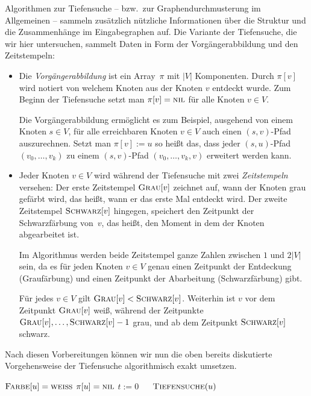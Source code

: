 \begin{bem}
Algorithmen zur Tiefensuche -- bzw.~zur Graphendurchmusterung im Allgemeinen -- sammeln zusätzlich nützliche Informationen über die Struktur und die Zusammenhänge im Eingabegraphen auf.
Die Variante der Tiefensuche, die wir hier untersuchen, sammelt Daten in Form der Vorgängerabbildung und den Zeitstempeln:
%
\begin{itemize}
 \item Die \emph{Vorgängerabbildung} ist ein Array~$\pi$ mit $|V|$ Komponenten.
 Durch $\pi[v]$ wird notiert von welchem Knoten aus der Knoten $v$ entdeckt wurde.
 Zum Beginn der Tiefensuche setzt man $\pi[v]=\mathop{\text{\textsc{nil}}}$ für alle Knoten $v \in V$.

 Die Vorgängerabbildung ermöglicht es zum Beispiel, ausgehend von einem Knoten $s \in V$, für alle erreichbaren Knoten $v \in V$ auch einen $(s,v)$-Pfad auszurechnen.
Setzt man $\pi[v]:=u$ so heißt das, dass jeder $(s,u)$-Pfad $(v_0,\ldots,v_k)$ zu einem $(s,v)$-Pfad $(v_0,\ldots,v_k,v)$ erweitert werden kann.
 \item Jeder Knoten $v \in V$ wird während der Tiefensuche mit zwei \emph{Zeitstempeln} versehen: Der erste Zeitstempel $\mathop{\text{\textsc{Grau}}}[v]$ zeichnet auf, wann der Knoten grau gefärbt wird, das heißt, wann er das erste Mal entdeckt wird.
Der zweite Zeitstempel $\mathop{\text{\textsc{Schwarz}}}[v]$ hingegen, speichert den Zeitpunkt der Schwarzfärbung von~$v$, das heißt, den Moment in dem der Knoten abgearbeitet ist.

Im Algorithmus werden beide Zeitstempel ganze Zahlen zwischen $1$ und $2 |V|$ sein, da es für jeden Knoten $v \in V$ genau einen Zeitpunkt der Entdeckung (Graufärbung) und einen Zeitpunkt der Abarbeitung (Schwarzfärbung) gibt.

Für jedes $v \in V$ gilt $\mathop{\text{\textsc{Grau}}}[v] < \mathop{\text{\textsc{Schwarz}}}[v]$.
Weiterhin ist $v$ vor dem Zeitpunkt $\mathop{\text{\textsc{Grau}}}[v]$ weiß, während der Zeitpunkte $\mathop{\text{\textsc{Grau}}}[v],\ldots,\mathop{\text{\textsc{Schwarz}}}[v]-1$ grau, und ab dem Zeitpunkt $\mathop{\text{\textsc{Schwarz}}}[v]$ schwarz.

\end{itemize}
\end{bem}

\begin{bem} 
Nach diesen Vorbereitungen können wir nun die oben bereits diskutierte Vorgehensweise der Tiefensuche algorithmisch exakt umsetzen.


\begin{algorithm}[H]
	\caption{$\cc{Vollständige-Tiefensuche}(D)$}
	\begin{algorithmic}[1]
		 \STATE $\mathop{\text{\textsc{Farbe}}}[u]=\mathop{\text{\textsc{weiß}}}$
		 \STATE $\pi[u]=\mathop{\text{\textsc{nil}}}$
		\ENDFOR
		\STATE $t := 0$ $\quad$ 
		\label{line:tiefensuche-hauptschleife-start}
 		  \STATE $\mathop{\text{\textsc{Tiefensuche}}}(u)$
 		 \ENDIF 
		\ENDFOR\label{line:tiefensuche-hauptschleife-ende}
	\end{algorithmic}
\end{algorithm}
\end{bem}

